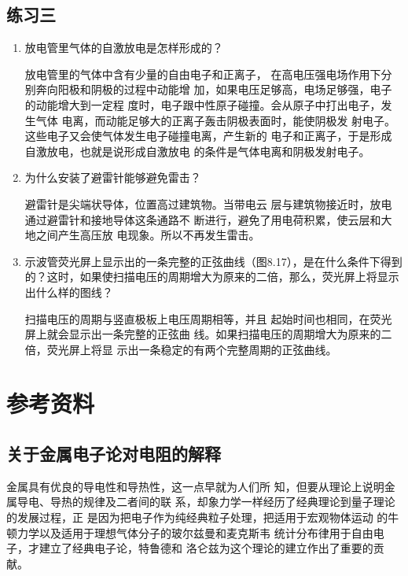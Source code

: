 \subsection{练习三}
\begin{enumerate}
    \item 放电管里气体的自激放电是怎样形成的？

    \begin{solution}
        放电管里的气体中含有少量的自由电子和正离子，
        在高电压强电场作用下分别奔向阳极和阴极的过程中动能增
        加，如果电压足够高，电场足够强，电子的动能增大到一定程
        度时，电子跟中性原子碰撞。会从原子中打出电子，发生气体
        电离，而动能足够大的正离子轰击阴极表面时，能使阴极发
        射电子。这些电子又会使气体发生电子碰撞电离，产生新的
        电子和正离子，于是形成自激放电，也就是说形成自激放电
        的条件是气体电离和阴极发射电子。
    \end{solution}
    
    \item 为什么安装了避雷针能够避免雷击？

    \begin{solution}
        避雷针是尖端状导体，位置高过建筑物。当带电云
        层与建筑物接近时，放电通过避雷针和接地导体这条通路不
        断进行，避免了用电荷积累，使云层和大地之间产生高压放
        电现象。所以不再发生雷击。
    \end{solution}
    
    \item 示波管荧光屏上显示出的一条完整的正弦曲线（图8.17），是在什么条件下得到的？这时，如果使扫描电压的周期增大为原来的二倍，那么，荧光屏上将显示出什么样的图线？

    \begin{solution}
        扫描电压的周期与竖直极板上电压周期相等，并且
        起始时间也相同，在荧光屏上就会显示出一条完整的正弦曲
        线。如果扫描电压的周期增大为原来的二倍，荧光屏上将显
        示出一条稳定的有两个完整周期的正弦曲线。
    \end{solution}
    
\end{enumerate}


\section{参考资料}
\subsection{关于金属电子论对电阻的解释}
金属具有优良的导电性和导热性，这一点早就为人们所
知，但要从理论上说明金属导电、导热的规律及二者间的联
系，却象力学一样经历了经典理论到量子理论的发展过程，正
是因为把电子作为纯经典粒子处理，把适用于宏观物体运动
的牛顿力学以及适用于理想气体分子的玻尔兹曼和麦克斯韦
统计分布律用于自由电子，才建立了经典电子论，特鲁德和
洛仑兹为这个理论的建立作出了重要的贡献。

